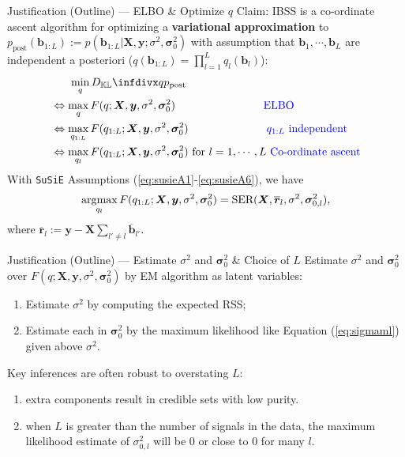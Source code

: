 \documentclass[10pt]{beamer}
\begin{document}
\begin{frame}{Justification (Outline) --- \normalsize ELBO \& Optimize $q$}
    Claim: IBSS is a co-ordinate ascent algorithm for optimizing a \textbf{variational approximation} to $p_{\text{post}}(\bm{b}_{1:L}):=p(\bm{b}_{1:L}|\bm{X},\bm{y};\sigma^2,\bm{\sigma}_0^2)$ 
        with assumption that $\bm{b}_1,\cdots,\bm{b}_L$ are independent a posteriori ($q(\bm{b}_{1:L}) = \prod_{l=1}^L q_l(\bm{b}_l)$):
    \begin{align}
        & ~~~~~ \min_q \infdiv{q}{p_{\text{post}}} \\
        & \iff \max_q F(q;\bm{X},\bm{y},\sigma^2,\bm{\sigma}_0^2)\hspace{8em}{\text{\color{blue}ELBO}} \\
        & \iff \max_{q_{1:L}} F(q_{1:L};\bm{X},\bm{y},\sigma^2,\bm{\sigma}_0^2)\hspace{7.1em}{\text{\color{blue}$q_{1:L}$ independent}} \\
        & \iff \max_{q_l}F(q_{1:L};\bm{X},\bm{y},\sigma^2,\bm{\sigma}_0^2)~\text{for}~l=1,\cdots,L\ {\text{\color{blue}Co-ordinate ascent}}
    \end{align}
    With \texttt{SuSiE} Assumptions (\ref{eq:susieA1}-\ref{eq:susieA6}), we have
    \begin{gather}
        \operatorname*{\arg\!max}_{q_l} F(q_{1:L};\bm{X},\bm{y},\sigma^2,\bm{\sigma}_0^2) = \text{SER}(\bm{X},\overline{\bm{r}}_l,\sigma^2,\bm{\sigma}_{0,l}^2),\label{eq:vaest}
    \end{gather}
    where $\overline{\bm{r}}_l:=\bm{y}-\bm{X}\sum_{l'\neq l}\overline{\bm{b}}_{l'}$. 
\end{frame}


\begin{frame}{Justification (Outline) --- \normalsize Estimate $\sigma^2$ and $\bm{\sigma}_0^2$ \& Choice of $L$}
    Estimate $\sigma^2$ and $\bm{\sigma}_0^2$ over $F(q;\bm{X},\bm{y},\sigma^2,\bm{\sigma}^2_0)$ by EM algorithm as latent variables:
    \begin{enumerate}
        \item Estimate $\sigma^2$ by computing the expected RSS;
        \item Estimate each in $\bm{\sigma}^2_0$ by the maximum likelihood like Equation (\ref{eq:sigmaml}) given above $\sigma^2$.
    \end{enumerate}

    \bigskip
    
    Key inferences are often robust to overstating $L$: 
    \begin{enumerate}
        \item extra components result in credible sets with low purity.
        \item when $L$ is greater than the number of signals in the data, the maximum likelihood estimate of $\sigma^2_{0,l}$ will be 0 or close to 0 for many $l$.%
    \end{enumerate}
\end{frame}
\end{document}
